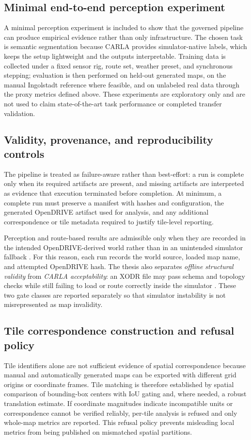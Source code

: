 \subsection{Minimal end-to-end perception experiment}
\label{sec:minimal_perception_experiment}
A minimal perception experiment is included to show that the governed pipeline can produce empirical evidence rather than only infrastructure. The chosen task is semantic segmentation because CARLA provides simulator-native labels, which keeps the setup lightweight and the outputs interpretable. Training data is collected under a fixed sensor rig, route set, weather preset, and synchronous stepping; evaluation is then performed on held-out generated maps, on the manual Ingolstadt reference where feasible, and on unlabeled real data through the proxy metrics defined above. These experiments are exploratory only and are not used to claim state-of-the-art task performance or completed transfer validation.

\subsection{Validity, provenance, and reproducibility controls}
\label{sec:artifact_contract}
The pipeline is treated as failure-aware rather than best-effort: a run is complete only when its required artifacts are present, and missing artifacts are interpreted as evidence that execution terminated before completion. At minimum, a complete run must preserve a manifest with hashes and configuration, the generated OpenDRIVE artifact used for analysis, and any additional correspondence or tile metadata required to justify tile-level reporting.

Perception and route-based results are admissible only when they are recorded in the intended OpenDRIVE-derived world rather than in an unintended simulator fallback \cite{carla_maps_opendrive}. For this reason, each run records the world source, loaded map name, and attempted OpenDRIVE hash. The thesis also separates \emph{offline structural validity} from \emph{CARLA acceptability}: an XODR file may pass schema and topology checks while still failing to load or route correctly inside the simulator \cite{carla_python_api}. These two gate classes are reported separately so that simulator instability is not misrepresented as map invalidity.

\subsection{Tile correspondence construction and refusal policy}
\label{sec:tile_correspondence}
Tile identifiers alone are not sufficient evidence of spatial correspondence because manual and automatically generated maps can be exported with different grid origins or coordinate frames. Tile matching is therefore established by spatial comparison of bounding-box centers with IoU gating and, where needed, a robust translation estimate. If coordinate magnitudes indicate incompatible units or correspondence cannot be verified reliably, per-tile analysis is refused and only whole-map metrics are reported. This refusal policy prevents misleading local metrics from being published on mismatched spatial partitions.

